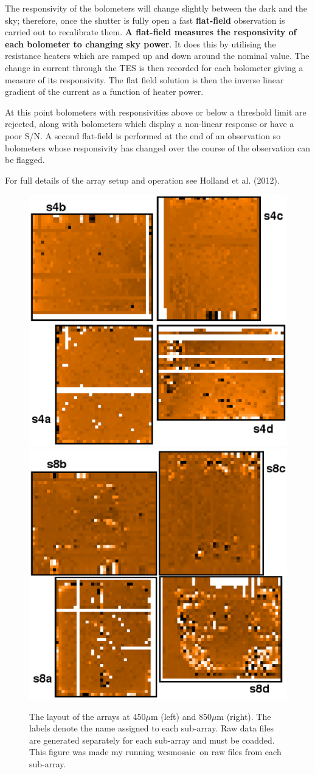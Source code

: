 \documentclass[twoside,11pt]{article}
\newcommand{\xref}[3]{#1}
\renewcommand{\_}{\texttt{\symbol{95}}}
\newcommand{\task}[1]{\textsf{#1}}
\newcommand{\wcsmosaic}{\xref{\task{wcsmosaic}}{sun95}{WCSMOSAIC}}
\begin{document}
The responsivity of the bolometers will change slightly between the dark and the sky; therefore, once the shutter is fully open a fast \textbf{flat-field} observation is carried out to recalibrate them. \textbf{A flat-field measures the responsivity of each bolometer to changing sky power}. It does this by utilising the resistance heaters which are ramped up and down around the nominal value. The change in current through the TES is then recorded for each bolometer giving a measure of its responsivity. The flat field solution is then the inverse linear gradient of the current as a function of heater power.

At this point bolometers with responsivities above or below a threshold limit are rejected, along with bolometers which display a non-linear response or have a poor S/N.  A second flat-field is performed at the end of an observation so bolometers whose responsivity has changed over the course of the observation can be flagged.


For full details of the array setup and operation see Holland et al. (2012).

\begin{figure}[t!]
\begin{center}
\includegraphics[width=0.4\linewidth]{450array.eps}
\hspace{1cm}
\includegraphics[width=0.4\linewidth]{850array.eps}
\label{fig:arrays}
\caption{\small The layout of the arrays at 450$\mu$m (left) and 850$\mu$m (right). The labels denote the name assigned to each sub-array. Raw data files are generated separately for each sub-array and must be coadded. This figure was made my running \wcsmosaic\ on raw files from each sub-array.}
\end{center}
\end{figure}
\end{document}

